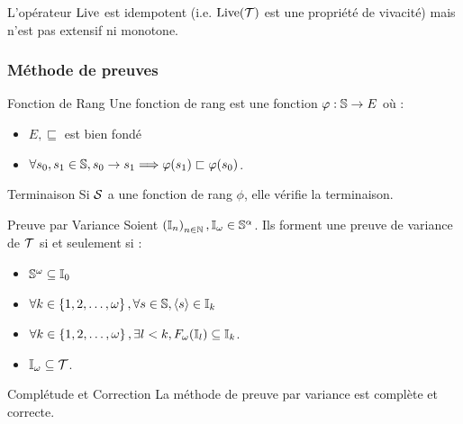 \documentclass{cours}
\begin{document}
\begin{propositionfr}{}{}
	L'opérateur $\rm Live$ est idempotent (i.e. $\rm Live(\mT)$ est une propriété de vivacité) mais n'est pas extensif ni monotone.
\end{propositionfr}

\subsubsection{Méthode de preuves}
\begin{définition}{Fonction de Rang}{}
Une fonction de rang est une fonction $\phi : \S\to E$ où :
\begin{itemize}
	\item $E, \sqsubseteq$ est bien fondé
	\item $\forall s_{0}, s_{1} \in \S, s_{0} \rightarrow s_{1} \Longrightarrow \phi(s_{1}) \sqsubset \phi(s_{0})$.
\end{itemize}
\end{définition}

\begin{théorème}{Terminaison}{}
Si $\mS$ a une fonction de rang $\phi$, elle vérifie la terminaison.
\end{théorème}

\begin{propositionfr}{Preuve par Variance}{}
	Soient $\left(\I_{n}\right)_{n\in \N}, \I_{\omega} \in \S^{\alpha}$. Ils forment une preuve de variance de $\mT$ si et seulement si :
	\begin{itemize}
		\item $\S^{\omega} \subseteq \I_{0}$
		\item $\forall k \in \left\{1, 2, \ldots, \omega\right\}, \forall s \in \S, \scalar{s} \in \I_{k}$
		\item $\forall k \in \left\{1, 2, \ldots, \omega\right\}, \exists l < k, F_{\omega}(\I_{l}) \subseteq \I_{k}$.
		\item $\I_{\omega} \subseteq \mT$.
	\end{itemize}
\end{propositionfr}
\begin{théorème}{Complétude et Correction}{}
La méthode de preuve par variance est complète et correcte.
\end{théorème}
\end{document}
